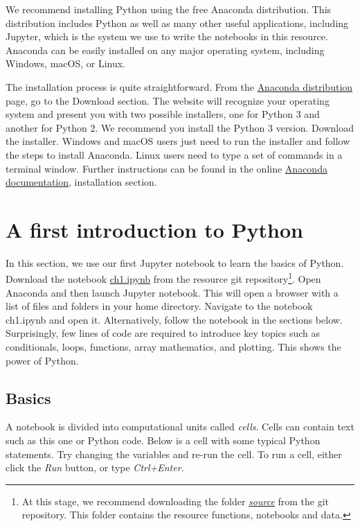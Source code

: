 \documentclass[a4paper , 12pt]{book}
\begin{document}
We recommend installing Python using the free Anaconda distribution. This distribution includes Python as well as many other useful applications, including Jupyter, which is the system we use to write the notebooks in this resource. Anaconda can be easily installed on any major operating system, including Windows, macOS, or Linux.

The installation process is quite straightforward. From the \href {https://www.anaconda.com/distribution/}{Anaconda distribution} page, go to the Download section. The website will recognize your operating system and present you with two possible installers, one for Python 3 and another for Python 2. We recommend you install the Python 3 version. Download the installer. Windows and macOS users just need to run the installer and follow the steps to install Anaconda. Linux users need to type a set of commands in a terminal window. Further instructions can be found in the online \href {https://docs.anaconda.com/anaconda/} {Anaconda documentation}, installation section.

\section{A first introduction to Python}

In this section, we use our first Jupyter notebook to learn the basics of Python. Download the notebook \href{https://github.com/nfcd/compGeo/blob/master/source/notebooks/ch1.ipynb}{ch1.ipynb} from the resource git repository\footnote{At this stage, we recommend downloading the folder \href{https://github.com/nfcd/compGeo/blob/master/source}{\textit{source}} from the git repository. This folder contains the resource functions, notebooks and data.}. Open Anaconda and then launch Jupyter notebook. This will open a browser with a list of files and folders in your home directory. Navigate to the notebook ch1.ipynb and open it. Alternatively, follow the notebook in the sections below. Surprisingly, few lines of code are required to introduce key topics such as conditionals, loops, functions, array mathematics, and plotting. This shows the power of Python.

\subsection{Basics}

A notebook is divided into computational units called \textit{cells}. Cells can contain text such as this one or Python code. Below is a cell with some typical Python statements. Try changing the variables and re-run the cell. To run a cell, either click the \textit{Run} button, or type \textit{Ctrl+Enter}.
\end{document}
